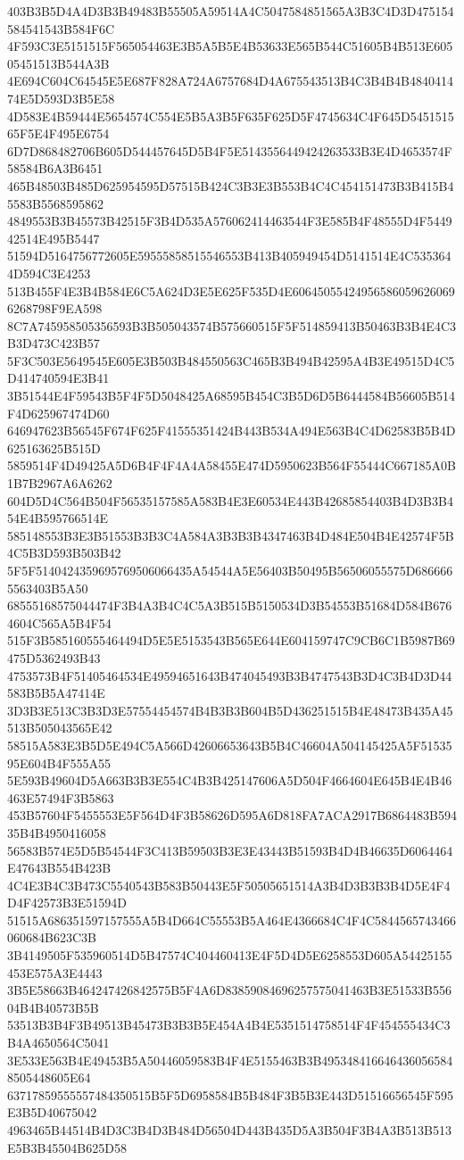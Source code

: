{{{{{{{{{{{{{{{{{{{{{403B3B5D4A4D3B3B49483B55505A59514A4C5047584851565A3B3C4D3D475154584541543B584F6C
4F593C3E5151515F565054463E3B5A5B5E4B53633E565B544C51605B4B513E60505451513B544A3B
4E694C604C64545E5E687F828A724A6757684D4A675543513B4C3B4B4B484041474E5D593D3B5E58
4D583E4B59444E5654574C554E5B5A3B5F635F625D5F4745634C4F645D545151565F5E4F495E6754
6D7D868482706B605D544457645D5B4F5E5143556449424263533B3E4D4653574F58584B6A3B6451
465B48503B485D625954595D57515B424C3B3E3B553B4C4C454151473B3B415B45583B5568595862
4849553B3B45573B42515F3B4D535A576062414463544F3E585B4F48555D4F544942514E495B5447
51594D5164756772605E59555858515546553B413B405949454D5141514E4C5353644D594C3E4253
513B455F4E3B4B584E6C5A624D3E5E625F535D4E606450554249565860596260696268798F9EA598
8C7A745958505356593B3B505043574B575660515F5F514859413B50463B3B4E4C3B3D473C423B57
5F3C503E5649545E605E3B503B484550563C465B3B494B42595A4B3E49515D4C5D414740594E3B41
3B51544E4F59543B5F4F5D5048425A68595B454C3B5D6D5B6444584B56605B514F4D625967474D60
646947623B56545F674F625F41555351424B443B534A494E563B4C4D62583B5B4D625163625B515D
5859514F4D49425A5D6B4F4F4A4A58455E474D5950623B564F55444C667185A0B1B7B2967A6A6262
604D5D4C564B504F56535157585A583B4E3E60534E443B42685854403B4D3B3B454E4B595766514E
585148553B3E3B51553B3B3C4A584A3B3B3B4347463B4D484E504B4E42574F5B4C5B3D593B503B42
5F5F5140424359695769506066435A54544A5E56403B50495B56506055575D6866665563403B5A50
68555168575044474F3B4A3B4C4C5A3B515B5150534D3B54553B51684D584B6764604C565A5B4F54
515F3B585160555464494D5E5E5153543B565E644E604159747C9CB6C1B5987B69475D5362493B43
4753573B4F51405464534E49594651643B474045493B3B4747543B3D4C3B4D3D44583B5B5A47414E
3D3B3E513C3B3D3E57554454574B4B3B3B604B5D436251515B4E48473B435A45513B505043565E42
58515A583E3B5D5E494C5A566D42606653643B5B4C46604A504145425A5F5153595E604B4F555A55
5E593B49604D5A663B3B3E554C4B3B425147606A5D504F4664604E645B4E4B46463E57494F3B5863
453B57604F5455553E5F564D4F3B58626D595A6D818FA7ACA2917B6864483B59435B4B4950416058
56583B574E5D5B54544F3C413B59503B3E3E43443B51593B4D4B46635D6064464E47643B554B423B
4C4E3B4C3B473C5540543B583B50443E5F50505651514A3B4D3B3B3B4D5E4F4D4F42573B3E51594D
51515A686351597157555A5B4D664C55553B5A464E4366684C4F4C5844565743466060684B623C3B
3B4149505F535960514D5B47574C404460413E4F5D4D5E6258553D605A54425155453E575A3E4443
3B5E58663B464247426842575B5F4A6D83859084696257575041463B3E51533B55604B4B40573B5B
53513B3B4F3B49513B45473B3B3B5E454A4B4E5351514758514F4F454555434C3B4A4650564C5041
3E533E563B4E49453B5A50446059583B4F4E5155463B3B4953484166464360565848505448605E64
63717859555557484350515B5F5D6958584B5B484F3B5B3E443D51516656545F595E3B5D40675042
4963465B44514B4D3C3B4D3B484D56504D443B435D5A3B504F3B4A3B513B513E5B3B45504B625D58
}}}}}}}}}}}}}}}}}}}}}
